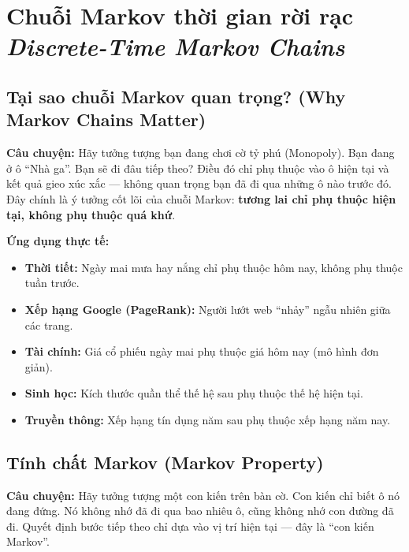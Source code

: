 \chapter{Chuỗi Markov thời gian rời rạc\\{\normalsize\textit{Discrete-Time Markov Chains}}}
\label{ch:discrete}

\section{Tại sao chuỗi Markov quan trọng? (Why Markov Chains Matter)}
\label{sec:why-markov}

\textbf{Câu chuyện:} Hãy tưởng tượng bạn đang chơi cờ tỷ phú (Monopoly).
Bạn đang ở ô ``Nhà ga''. Bạn sẽ đi đâu tiếp theo?
Điều đó chỉ phụ thuộc vào ô hiện tại và kết quả gieo xúc xắc ---
không quan trọng bạn đã đi qua những ô nào trước đó.
Đây chính là ý tưởng cốt lõi của chuỗi Markov: \textbf{tương lai chỉ phụ thuộc hiện tại, không phụ thuộc quá khứ}.

\textbf{Ứng dụng thực tế:}
\begin{itemize}[nosep]
  \item \textbf{Thời tiết:} Ngày mai mưa hay nắng chỉ phụ thuộc hôm nay, không phụ thuộc tuần trước.
  \item \textbf{Xếp hạng Google (PageRank):} Người lướt web ``nhảy'' ngẫu nhiên giữa các trang.
  \item \textbf{Tài chính:} Giá cổ phiếu ngày mai phụ thuộc giá hôm nay (mô hình đơn giản).
  \item \textbf{Sinh học:} Kích thước quần thể thế hệ sau phụ thuộc thế hệ hiện tại.
  \item \textbf{Truyền thông:} Xếp hạng tín dụng năm sau phụ thuộc xếp hạng năm nay.
\end{itemize}

\section{Tính chất Markov (Markov Property)}
\label{sec:markov-property}

\textbf{Câu chuyện:} Hãy tưởng tượng một con kiến trên bàn cờ. Con kiến chỉ biết ô nó đang đứng.
Nó không nhớ đã đi qua bao nhiêu ô, cũng không nhớ con đường đã đi.
Quyết định bước tiếp theo chỉ dựa vào vị trí hiện tại --- đây là ``con kiến Markov''.

